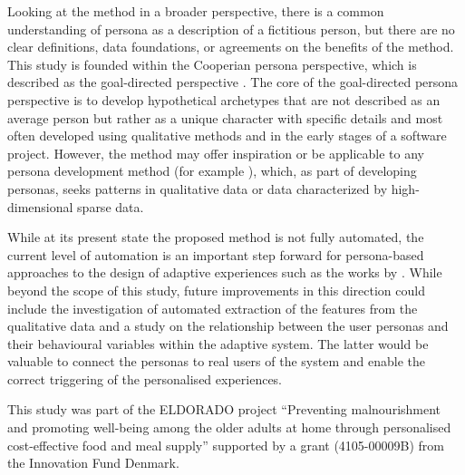 Looking at the method in a broader perspective, there is a common understanding of persona as a description of a fictitious person, but there are no clear definitions, data foundations, or agreements on the benefits of the method. This study is founded within the Cooperian persona perspective, which is described as the goal-directed perspective \citep{Nielsen2002,Floyd2008a}. The core of the goal-directed persona perspective is to develop hypothetical archetypes that are not described as an average person but rather as a unique character with specific details and most often developed using qualitative methods and in the early stages of a software project. However, the method may offer inspiration or be applicable to any persona development method (for example \citep{Pruitt2003}), which, as part of developing personas, seeks patterns in qualitative data or data characterized by high-dimensional sparse data.

While at its present state the proposed method is not fully automated, the current level of automation is an important step forward for persona-based approaches to the design of adaptive experiences such as the works by \cite{Madureira2014}. While beyond the scope of this study, future improvements in this direction could include the investigation of automated extraction of the features from the qualitative data and a study on the relationship between the user personas and their behavioural variables within the adaptive system. The latter would be valuable to connect the personas to real users of the system and enable the correct triggering of the personalised experiences. 





\begin{acknowledgements}

This study was part of the ELDORADO project ``Preventing malnourishment and promoting well-being among the older adults at home through personalised cost-effective food and meal supply'' supported by a grant (4105-00009B) from the Innovation Fund Denmark.

\end{acknowledgements}

